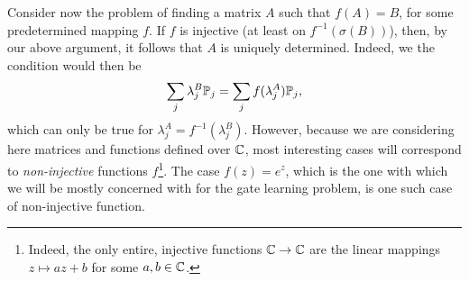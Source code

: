 Consider now the problem of finding a matrix $A$ such that $f(A)=B$, for some predetermined mapping $f$.
If $f$ is injective (at least on $f^{-1}(\sigma(B))$), then, by our above argument, it follows that $A$ is uniquely determined. Indeed, we the condition would then be
\begin{equation}
    \sum_j \lambda_j^B \mathbb{P}_j = \sum_j f(\lambda_j^A) \mathbb{P}_j,
\end{equation}
which can only be true for $\lambda_j^A = f^{-1}(\lambda_j^B)$.
However, because we are considering here matrices and functions defined over $\mathbb{C}$, most interesting cases will correspond to \textit{non-injective} functions $f$\footnote{Indeed, the only entire, injective functions $\mathbb{C}\to\mathbb{C}$ are the linear mappings $z\mapsto az+b$ for some $a,b\in\mathbb{C}$.}. The case $f(z)=e^z$, which is the one with which we will be mostly concerned with for the gate learning problem, is one such case of non-injective function.

